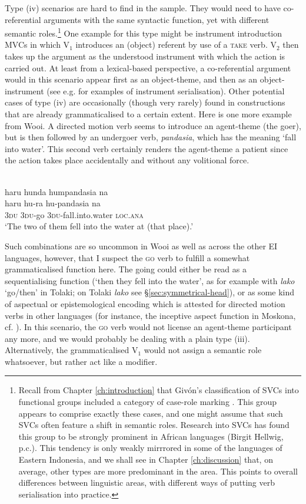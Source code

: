 Type (iv) scenarios are hard to find in the sample. They would need to have co-referential arguments with the same syntactic function, yet with different semantic roles.\footnote{Recall from Chapter \ref{ch:introduction} that Givón's classification of SVCs into functional groups included a category of case-role marking \citep{givon1991serial}. This group appears to comprise exactly these cases, and one might assume that such SVCs often feature a shift in semantic roles. Research into SVCs has found this group to be strongly prominent in African languages (Birgit Hellwig, p.c.). This tendency is only weakly mirrrored in some of the languages of Eastern Indonesia, and we shall see in Chapter \ref{ch:discussion} that, on average, other types are more predominant in the area. This points to overall differences between linguistic areas, with different ways of putting verb serialisation into practice.} One example for this type might be instrument introduction MVCs in which V$_1$ introduces an (object) referent by use of a \textsc{take} verb. V$_2$ then takes up the argument as the understood instrument with which the action is carried out. At least from a lexical-based perspective, a co-referential argument would in this scenario appear first as an object-theme, and then as an object-instrument (see e.g. \citealt[305]{Durie1997} for examples of instrument serialisation). Other potential cases of type (iv) are occasionally (though very rarely) found in constructions that are already grammaticalised to a certain extent. Here is one more example from Wooi. A directed motion verb seems to introduce an agent-theme (the goer), but is then followed by an undergoer verb, \textit{pandasia}, which has the meaning `fall into water'. This second verb certainly renders the agent-theme a patient since the action takes place accidentally and without any volitional force.

\ea 
{}\\
\glll haru hunda humpandasia na \\
haru hu-ra hu-pandasia na \\
3\textsc{du} 3\textsc{du}-go 3\textsc{du}-fall.into.water \textsc{loc}.\textsc{ana} \\
\glft `The two of them fell into the water at (that place).'\\ 
\z

Such combinations are so uncommon in Wooi as well as across the other EI languages, however, that I suspect the \textsc{go} verb to fulfill a somewhat grammaticalised function here. The going could either be read as a sequentialising function (`then they fell into the water', as for example with \textit{lako} `go/then' in Tolaki; on Tolaki \textit{lako} see §\ref{sec:symmetrical-head}), or as some kind of aspectual or epistemological encoding which is attested for directed motion verbs in other languages (for instance, the inceptive aspect function in Moskona, cf. \citealt[297]{gravelle2010grammar}). In this scenario, the \textsc{go} verb would not license an agent-theme participant any more, and we would probably be dealing with a plain type (iii). Alternatively, the grammaticalised V$_1$ would not assign a semantic role whatsoever, but rather act like a modifier.

